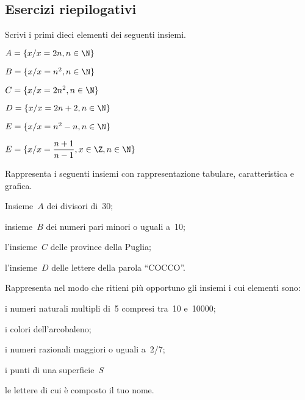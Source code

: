 \subsection{Esercizi riepilogativi}

\begin{esercizio}
\label{ese:6.23}
Scrivi i primi dieci elementi dei seguenti insiemi.

\vspace{-.6em}
\begin{multicols}{2}
\begin{enumeratea}
\item \(A=\{x/x=2n, n\in\N\}\)
\item \(B=\{x/x=n^{2}, n\in\N\}\)
\item \(C=\{x/x=2n^{2}, n\in\N\}\)
\item \(D=\{x/x=2n+2, n\in\N\}\)
\item \(E=\{x/x=n^{2}-n, n\in\N\}\)
\item \(E=\{x/x=\dfrac{n+1}{n-1}, x\in\Z, n\in\N \}\)
\end{enumeratea}
\end{multicols}

\vspace{-1.em}
\end{esercizio}


\begin{esercizio}
\label{ese:6.24}
Rappresenta i seguenti insiemi con rappresentazione tabulare, caratteristica 
e 
grafica.
\vspace{-.6em}
\begin{enumeratea}
\item Insieme~\(A\) dei divisori di~30;
\item insieme~\(B\) dei numeri pari minori o uguali a~10;
\item l'insieme~\(C\) delle province della Puglia;
\item l'insieme~\(D\) delle lettere della parola ``COCCO''.
\end{enumeratea}
\end{esercizio}

\begin{esercizio}
\label{ese:6.25}
Rappresenta nel modo che ritieni più opportuno gli insiemi i cui elementi 
sono:
\vspace{-.6em}
\begin{enumeratea}
\item i numeri naturali multipli di~5 compresi tra~10 e~10000;
\item i colori dell'arcobaleno;
\item i numeri razionali maggiori o uguali a~2/7;
\item i punti di una superficie~\(S\)
\item le lettere di cui è composto il tuo nome.
\end{enumeratea}
\end{esercizio}


